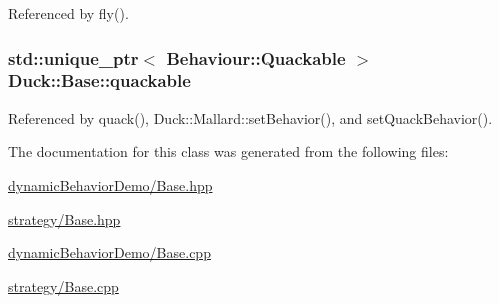 Referenced by fly().

\hypertarget{classDuck_1_1Base_ae34ecb3b0d147b27551f401cae8f0ebb}{
\subsubsection[{quackable}]{\setlength{\rightskip}{0pt plus 5cm}std\-::unique\-\_\-ptr$<$ {\bf Behaviour\-::\-Quackable} $>$ Duck\-::\-Base\-::quackable\hspace{0.3cm}{\ttfamily [protected]}}}\label{classDuck_1_1Base_ae34ecb3b0d147b27551f401cae8f0ebb}


Referenced by quack(), Duck\-::\-Mallard\-::set\-Behavior(), and set\-Quack\-Behavior().



The documentation for this class was generated from the following files\-:\begin{DoxyCompactItemize}
\item 
\hyperlink{dynamicBehaviorDemo_2Base_8hpp}{dynamic\-Behavior\-Demo/\-Base.\-hpp}\item 
\hyperlink{strategy_2Base_8hpp}{strategy/\-Base.\-hpp}\item 
\hyperlink{dynamicBehaviorDemo_2Base_8cpp}{dynamic\-Behavior\-Demo/\-Base.\-cpp}\item 
\hyperlink{strategy_2Base_8cpp}{strategy/\-Base.\-cpp}\end{DoxyCompactItemize}
